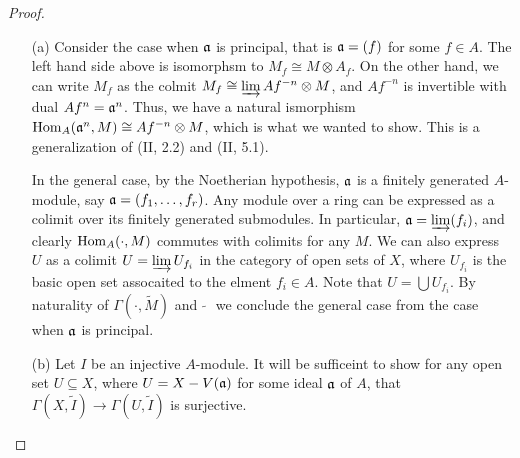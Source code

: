 \documentclass{article}
\begin{document}
\begin{enumerate} [label=\textbf{\arabic*.}, leftmargin=0em]
\begin{proof} $ $ \vspace{0pt}
\begin{itemize} [leftmargin=0cm]
\item[(a)] Consider the case when $\mathfrak{a}$ is principal, that is $\mathfrak{a} = (f)$ for some $f \in A$.
The left hand side above is isomorphsm to $M_f \cong M \otimes A_f$.
On the other hand, we can write $M_f$ as the colmit $M_f \cong \varinjlim Af^{-n} \otimes M$, and $Af^{-n}$ is invertible with dual $Af^n = \mathfrak{a}^n$.
Thus, we have a natural ismorphism $\operatorname{Hom}_A(\mathfrak{a}^n, M) \cong Af^{-n} \otimes M$, which is what we wanted to show.
This is a generalization of (II, 2.2) and (II, 5.1).

In the general case, by the Noetherian hypothesis, $\mathfrak{a}$ is a finitely generated $A$-module, say $\mathfrak{a} = (f_1, \dots, f_r)$.
Any module over a ring can be expressed as a colimit over its finitely generated submodules.
In particular, $\mathfrak{a} = \varinjlim (f_i)$, and clearly $\operatorname{Hom}_A(\cdot, M)$ commutes with colimits for any $M$.
We can also express $U$ as a colimit $U = \varinjlim U_{f_i}$ in the category of open sets of $X$, where $U_{f_i}$ is the basic open set assocaited to the elment $f_i \in A$.
Note that $U =\bigcup U_{f_i}$.
By naturality of $\Gamma(\cdot, \widetilde{M})$ and $\hspace{4pt}\widetilde{}\hspace{4pt}$ we conclude the general case from the case when $\mathfrak{a}$ is principal.

\item[(b)] Let $I$ be an injective $A$-module.
It will be sufficeint to show for any open set $U \subseteq X$, where $U = X - V(\mathfrak{a})$ for some ideal $\mathfrak{a}$ of $A$, that $\Gamma(X, \tilde{I}) \to \Gamma(U, \tilde{I})$ is surjective.

\end{itemize} 
\end{proof}

\end{enumerate}
\end{document}
